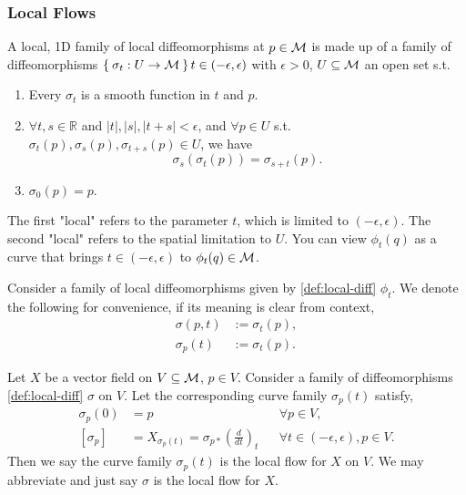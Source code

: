 \documentclass[../main.tex]{subfiles}
\begin{document}
    \subsubsection{Local Flows}
    \begin{definition}\label{def:local-diff}
        A local, 1D family of local diffeomorphisms at \(p \in \manifold[M]\) 
        is made up of a family of diffeomorphisms \(\Set{\sigma_t : U \to 
        \manifold[M]}{t \in (-\epsilon, \epsilon)}\) with \(\epsilon > 0\), 
        \(U \subseteq \manifold[M]\) an open set s.t. 
        \begin{enumerate}
            \item Every \(\sigma_t\) is a smooth function in \(t\) and \(p\).
            \item \(\forall t, s \in \mathbb{R}\) and \(|t|, |s|, |t+s| < 
            \epsilon\), and \(\forall p \in U\) s.t. \(\sigma_t(p), \sigma_s(p), 
            \sigma_{t+s}(p) \in U\), we have 
            \[
            \sigma_s(\sigma_t(p)) = \sigma_{s+t}(p).
            \]
            \item \(\sigma_0(p)=p\).
        \end{enumerate}
    \end{definition}
    \begin{remark}
        The first "local" refers to the parameter \(t\), which is limited to 
        \((-\epsilon, \epsilon)\). The second "local" refers to the spatial 
        limitation to \(U\). 
        You can view \(\phi_t(q)\) as a curve that brings \(t \in (-\epsilon, 
        \epsilon)\) to \(\phi_t(q) \in \manifold[M]\).
    \end{remark}
    \begin{definition}
        Consider a family of local diffeomorphisms given by \cref{def:local-diff} 
        \(\phi_t\). We denote the following for convenience, if its meaning is 
        clear from context, 
        \[
        \begin{aligned}
            \sigma(p, t) &:= \sigma_t(p), \\
            \sigma_p(t)  &:= \sigma_t(p).
        \end{aligned}
        \]
    \end{definition}
    \begin{definition}\label{def:local-flow}
        Let \(X\) be a vector field on \(V \subseteq \manifold[M]\), \(p \in V\). 
        Consider a family of diffeomorphisms \cref{def:local-diff} \(\sigma\) on 
        \(V\).
        Let the corresponding curve family \(\sigma_p(t)\) satisfy, 
        \[
        \begin{aligned}
            \sigma_p(0) &= p & &\forall p \in V, \\
            [\sigma_p] &= X_{\sigma_p(t)} = \sigma_{p*}\left(\frac{d}{dt}\right)_t
            & &\forall t \in (-\epsilon, \epsilon), p \in V.
        \end{aligned}
        \]
        Then we say the curve family \(\sigma_p(t)\) is the local flow for \(X\) 
        on \(V\).
        We may abbreviate and just say \(\sigma\) is the local flow for \(X\).
    \end{definition}
\end{document}
